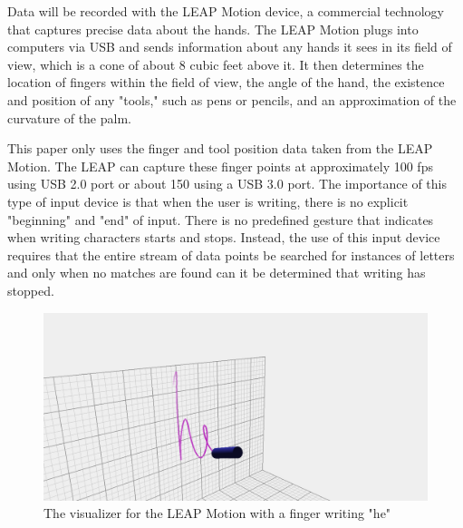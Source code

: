 Data will be recorded with the LEAP Motion device, a commercial technology that captures precise data about the hands.
The LEAP Motion plugs into computers via USB and sends information about any hands it sees in its field of view, which is a cone of about 8 cubic feet above it.
It then determines the location of fingers within the field of view, the angle of the hand, the existence and position of any "tools," such as pens or pencils, and an approximation of the curvature of the palm.

This paper only uses the finger  and tool position data taken from the LEAP Motion. The LEAP can capture these finger points at approximately 100 fps using USB 2.0 port or about 150 using a USB 3.0 port.
The importance of this type of input device is that when the user is writing, there is no explicit "beginning" and "end" of input. There is no predefined gesture that indicates when writing characters starts and stops. Instead, the use of this input device requires that the entire stream of data points be searched for instances of letters and only when no matches are found can it be determined that writing has stopped.
\begin{figure}
  \begin{center}
  \includegraphics[width=\columnwidth]{images/he-white.PNG}
  \caption{The visualizer for the LEAP Motion with a finger writing "he"}
  \label{fig:teaser}
  \end{center}  
\end{figure}
